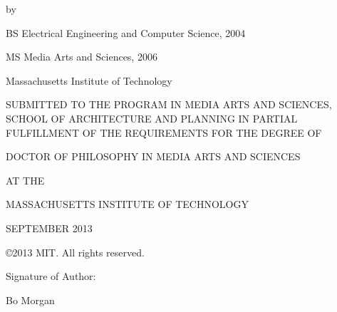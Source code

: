 \thispagestyle{empty}

\begin{addmargin}[1cm]{-2cm}
\begin{center}
    \begingroup
        \color{Maroon}\spacedallcaps{\myTitle}
    \endgroup

    \vspace{2mm}

    by

    \vspace{2mm}

    \myName

    \vspace{6mm}
    
    BS Electrical Engineering and Computer Science, 2004
    
    MS Media Arts and Sciences, 2006

    Massachusetts Institute of Technology
    
    \vspace{6mm}

 SUBMITTED TO THE PROGRAM IN MEDIA ARTS AND SCIENCES, SCHOOL OF
 ARCHITECTURE AND PLANNING IN PARTIAL FULFILLMENT OF THE REQUIREMENTS
 FOR THE DEGREE OF

    \vspace{6mm}

DOCTOR OF PHILOSOPHY IN MEDIA ARTS AND SCIENCES

AT THE

MASSACHUSETTS INSTITUTE OF TECHNOLOGY

    \vspace{6mm}

SEPTEMBER 2013

    \vspace{6mm}

\copyright 2013 MIT.  All rights reserved.

\end{center}        


\begin{flushright}
  \vspace{15mm}

  Signature of Author:\hspace{0.5cm}~\makebox[2.75in]{\hrulefill}

Bo Morgan

~
                          
  \vspace{15mm}
  

\end{flushright}
\end{addmargin}
